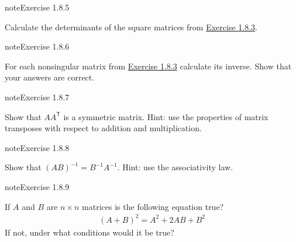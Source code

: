 \documentclass[letterpaper,10pt,english]{jupyterBook}
\begin{document}
\begin{sphinxadmonition}{note}{Exercise 1.8.5}



\sphinxAtStartPar
Calculate the determinants of the square matrices from \hyperref[exercise:matrices-ex2]{Exercise 1.8.3}.
\end{sphinxadmonition}
 \label{exercise:matrices-ex-inverse}

\begin{sphinxadmonition}{note}{Exercise 1.8.6}



\sphinxAtStartPar
For each non\sphinxhyphen{}singular matrix from \hyperref[exercise:matrices-ex2]{Exercise 1.8.3} calculate its inverse. Show that your answers are correct.
\end{sphinxadmonition}
 \label{exercise:matrices-ex-AAT-symmetric}

\begin{sphinxadmonition}{note}{Exercise 1.8.7}



\sphinxAtStartPar
Show that \(AA^\mathsf{T}\) is a symmetric matrix. Hint: use the properties of matrix transposes with respect to addition and multiplication.
\end{sphinxadmonition}
 \label{exercise:matrices-ex-invAB}

\begin{sphinxadmonition}{note}{Exercise 1.8.8}



\sphinxAtStartPar
Show that \((AB)^{-1} = B^{-1}A^{-1}\). Hint: use the associativity law.
\end{sphinxadmonition}
 \label{exercise:matrices-ex-AplusBsquared}

\begin{sphinxadmonition}{note}{Exercise 1.8.9}



\sphinxAtStartPar
If \(A\) and \(B\) are \(n \times n\) matrices is the following equation true?
\begin{equation*}
\begin{split}(A + B)^2 = A^2 + 2AB + B^2\end{split}
\end{equation*}
\sphinxAtStartPar
If not, under what conditions would it be true?
\end{sphinxadmonition}
 \label{exercise:matrices-ex-involutory-matrix}
\end{document}
